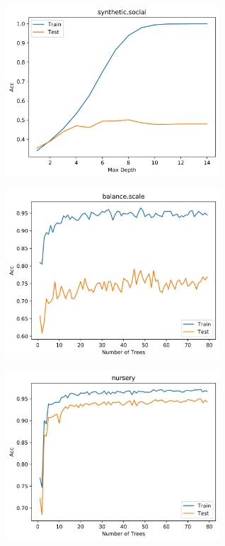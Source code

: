 \documentclass[11pt]{article}
\begin{document}
	\begin{figure}[H]
  		\begin{center}
  			\includegraphics[width=8cm]{code/pics/synthetic_social_DecisionTree}
  		\end{center}
	\end{figure}
	\begin{figure}[H]
  		\begin{center}
  			\includegraphics[width=8cm]{code/pics/balance_scale_RandomForest}
  		\end{center}
	\end{figure}
	\begin{figure}[H]
  		\begin{center}
  			\includegraphics[width=8cm]{code/pics/nursery_RandomForest}
  		\end{center}
	\end{figure}
\end{document}

